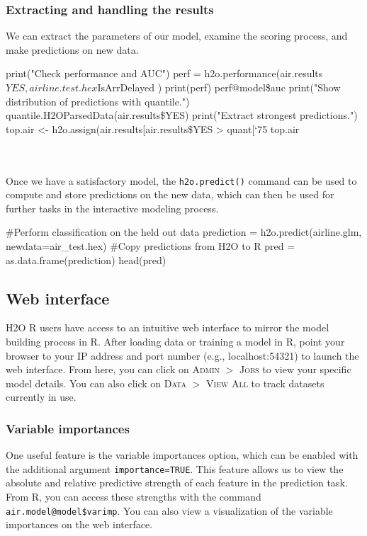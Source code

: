 \documentclass[11pt]{article}
\begin{document}
\subsubsection{Extracting and handling the results} \label{3.2.1}

We can extract the parameters of our model, examine the scoring process, and make predictions on new data.

\begin{spverbatim}
print("Check performance and AUC")
perf = h2o.performance(air.results$YES,airline.test.hex$IsArrDelayed )
print(perf)
perf@model\$auc
print("Show distribution of predictions with quantile.")
quantile.H2OParsedData(air.results\$YES)  
print("Extract strongest predictions.")
top.air <- h2o.assign(air.results[air.results\$YES > quant[‘75%
top.air
\end{spverbatim}
\noindent
\\
\\
Once we have a satisfactory model, the \texttt{h2o.predict()} command can be used to compute and store predictions on the new data, which can then be used for further tasks in the interactive modeling process.
\begin{spverbatim}
#Perform classification on the held out data
prediction = h2o.predict(airline.glm, newdata=air_test.hex)
#Copy predictions from H2O to R
pred = as.data.frame(prediction)
head(pred)
\end{spverbatim}
\subsection{Web interface} \label{3.3}
H2O R users have access to an intuitive web interface to mirror the model building process in R. After loading data or training a model in R, point your browser to your IP address and port number (e.g., localhost:54321) to launch the web interface. From here, you can click on \textsc{Admin} $>$ \textsc{Jobs} to view your specific model details. You can also click on \textsc{Data} $>$ \textsc{View All} to track datasets currently in use. 
\subsubsection{Variable importances} \label{3.3.1}
One useful feature is the variable importances option, which can be enabled with the additional argument \texttt{importance=TRUE}. This feature allows us to view the absolute and relative predictive strength of each feature in the prediction task. From R, you can access these strengths with the command \texttt{air.model@model\$varimp}. You can also view a visualization of the variable
importances on the web interface.
\end{document}
